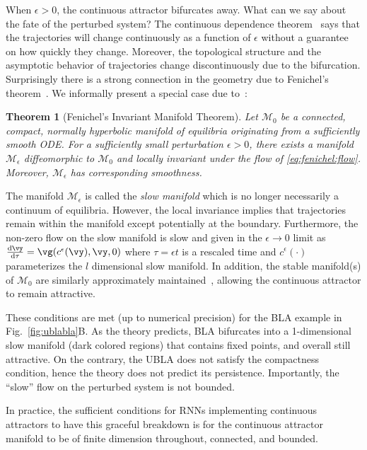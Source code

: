\documentclass{article}
\newcounter{ct}
\newcommand{\dm}[1]{\ensuremath{\mathrm{d}{#1}}} %
\newcommand{\RN}[2]{\frac{\dm{#1}}{\dm{#2}}} %
\newcommand{\manifold}{\mathcal{M}}
\newtheorem{theorem}{Theorem}
\theoremstyle{definition}
\theoremstyle{remark}
\begin{document}
When $\epsilon > 0$, the continuous attractor bifurcates away.
What can we say about the fate of the perturbed system?
The continuous dependence theorem~\cite{Chicone2006} says that the trajectories will change continuously as a function of $\epsilon$ without a guarantee on how quickly they change.
Moreover, the topological structure and the asymptotic behavior of trajectories change discontinuously due to the bifurcation.
Surprisingly there is a strong connection in the geometry due to Fenichel's theorem~\cite{fenichel1971}.
We informally present a special case due to~\cite{Jones1995}:
\begin{theorem}[Fenichel's Invariant Manifold Theorem]
Let $\manifold_0$ be a connected, compact, normally hyperbolic manifold of equilibria originating from a sufficiently smooth ODE.
For a sufficiently small perturbation $\epsilon > 0$, there exists a manifold $\manifold_\epsilon$ diffeomorphic to $\manifold_0$ and locally invariant under the flow of \eqref{eq:fenichel:flow}.
Moreover, $\manifold_\epsilon$ has corresponding smoothness.
\end{theorem}

The manifold $\manifold_\epsilon$ is called the \emph{slow manifold} which is no longer necessarily a continuum of equilibria.
However, the local invariance implies that trajectories remain within the manifold except potentially at the boundary.
Furthermore, the non-zero flow on the slow manifold is slow and given in the $\epsilon \to 0$ limit as $\RN{\vy}{\tau} = \vg(c^\epsilon(\vy), \vy, 0)$ where $\tau = \epsilon t$ is a rescaled time and $c^\epsilon(\cdot)$ parameterizes the $l$ dimensional slow manifold.
In addition, the stable manifold(s) of $\manifold_0$ are similarly approximately maintained~\cite{Jones1995}, allowing the continuous attractor to remain attractive.

These conditions are met (up to numerical precision) for the BLA example in Fig.~\ref{fig:ublabla}B.
As the theory predicts, BLA bifurcates into a 1-dimensional slow manifold (dark colored regions) that contains fixed points, and overall still attractive.
On the contrary, the UBLA does not satisfy the compactness condition, hence the theory does not predict its persistence.
Importantly, the ``slow'' flow on the perturbed system is not bounded.

In practice, the sufficient conditions for RNNs implementing continuous attractors to have this graceful breakdown is for the continuous attractor manifold to be of finite dimension throughout, connected, and bounded.
\end{document}
